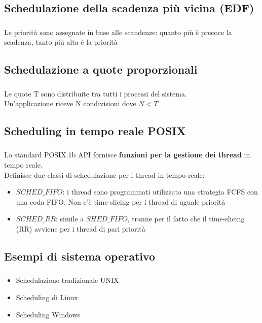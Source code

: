 \documentclass{beamer}
\newenvironment{mainframe}{
	\begin{frame}
		\frametitle{\insertsubsection}
		\framesubtitle{\insertsection}
	}{
	\end{frame}
}
\begin{document}
\subsection{Schedulazione della scadenza più vicina (EDF)}
\begin{mainframe}
	Le priorità sono assegnate in base alle scandenze: quanto più è precoce la scadenza, tanto più alta è la priorità
\end{mainframe}
\subsection{Schedulazione a quote proporzionali}
\begin{mainframe}
	Le quote T sono distribuite tra tutti i processi del sistema.\\
	Un'applicazione riceve N condivisioni dove $N < T$
\end{mainframe}
\subsection{Scheduling in tempo reale POSIX}
\begin{mainframe}
	Lo standard POSIX.1b API fornisce \textbf{funzioni per la gestione dei thread} in tempo reale.\\
	Definisce due classi di schedulazione per i thread in tempo reale:
	\begin{itemize}
		\item $SCHED\_FIFO$: i thread sono programmati utilizzato una strategia FCFS con una coda FIFO. Non c'è time-slicing per i thread di uguale priorità
		\item $SCHED\_RR$: simile a $SHED\_FIFO$, tranne per il fatto che il time-slicing (RR) avviene per i thread di pari priorità
	\end{itemize}
\end{mainframe}
\subsection{Esempi di sistema operativo}
\begin{mainframe}
	\begin{itemize}
		\item Schedulazione tradizionale UNIX
		\item Scheduling di Linux
		\item Scheduling Windows
	\end{itemize}
\end{mainframe}
\end{document}
